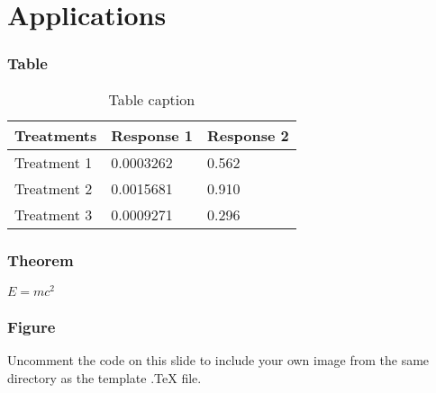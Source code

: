 \documentclass{beamer}
\begin{document}
\section{Applications}

\begin{frame}
\frametitle{Table}
\begin{table}
\begin{tabular}{l l l}
\toprule
\textbf{Treatments} & \textbf{Response 1} & \textbf{Response 2}\\
\midrule
Treatment 1 & 0.0003262 & 0.562 \\
Treatment 2 & 0.0015681 & 0.910 \\
Treatment 3 & 0.0009271 & 0.296 \\
\bottomrule
\end{tabular}
\caption{Table caption}
\end{table}
\end{frame}


\begin{frame}
\frametitle{Theorem}
\begin{theorem}
  $E = mc^2$
\end{theorem}
\end{frame}





\begin{frame}
\frametitle{Figure}
Uncomment the code on this slide to include your own image from the same directory as the template .TeX file.
\end{frame}
\end{document}
